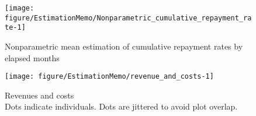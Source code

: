 \begin{comment}
\begin{itemize}
\vspace{1.0ex}\setlength{\itemsep}{1.0ex}\setlength{\baselineskip}{12pt}
\item	{\small \textsc{Figures} \ref{Figure cumulative repayment rate}, \ref{Figure cumulative repayment rate 2}, \ref{Figure cumulative repayment rate 3}} track the repayment history of each individuals. Full loan repayment is indicated when the cumulative installment rate reaches to one. (Traditional arm has three disbursements in which we adjust the numerator in computing cumulative rate.)
\item	The highest nonparametric estimate at the end of observation is observed with the large with grace arm.
\item	Mean repayment rate is lowest with the traditional arm (\textsf{planned} group). 
\end{itemize}
\end{comment}


\begin{Schunk}
\begin{figure}

{\centering \texttt{[image: figure/EstimationMemo/Nonparametric\_cumulative\_repayment\_rate-1]} 

}

\caption[Nonparametric mean estimation of cumulative repayment rates by elapsed months]{Nonparametric mean estimation of cumulative repayment rates by elapsed months}\label{Figure Nonparametric cumulative repayment rate}
\end{figure}
\end{Schunk}

\begin{Schunk}
\begin{figure}

{\centering \texttt{[image: figure/EstimationMemo/revenue\_and\_costs-1]} 

}

\caption{Revenues and costs\\ {\footnotesize Dots indicate individuals. Dots are jittered to avoid plot overlap. \setlength{\baselineskip}{8pt}}}\label{Figure revenue and costs}
\end{figure}
\end{Schunk}

